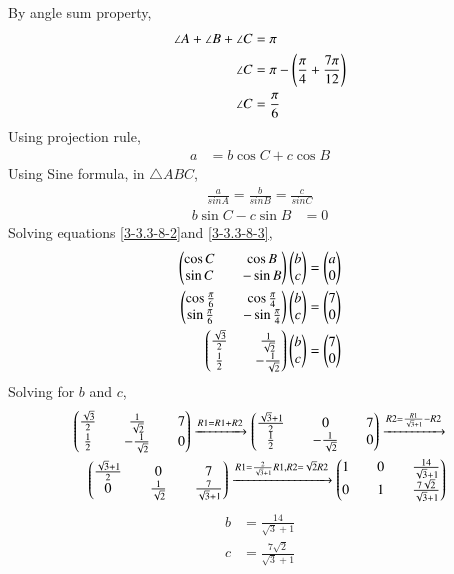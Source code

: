 \documentclass[journal]{IEEEtran}
\begin{document}
By angle sum property,
\begin{align}
    \angle{A}+\angle{B}+\angle{C}&=\pi\\
    \angle{C}&=\pi-\left(\frac{\pi}{4}+\frac{7\pi}{12}\right)\\
    \angle{C}&=\frac{\pi}{6}\label{3-3.3-8-1}
\end{align}
Using projection rule,
\begin{align}
    a&=b \cos C+c \cos B\label{3-3.3-8-2}
\end{align}
Using Sine formula, in $\triangle ABC$,
\begin{align}
    \frac{a}{sin A}=\frac{b}{sin B}=\frac{c}{sin C}
\end{align}
 \begin{align}
    b\sin C - c\sin B &=0\label{3-3.3-8-3}
\end{align}
 Solving equations \eqref{3-3.3-8-2}and \eqref{3-3.3-8-3},
\begin{align}
\begin{pmatrix}\cos C && \cos B\\ \sin C && -\sin B\end{pmatrix}\begin{pmatrix}b \\ c\end{pmatrix}=\begin{pmatrix}a \\ 0\end{pmatrix}\\
\begin{pmatrix}\cos \frac{\pi}{6} && \cos \frac{\pi}{4}\\ \sin \frac{\pi}{6} && -\sin\frac{\pi}{4}\end{pmatrix}\begin{pmatrix}b \\ c\end{pmatrix}=\begin{pmatrix}7 \\ 0\end{pmatrix}\\
\begin{pmatrix}\frac{\sqrt{3}}{2} && \frac{1}{\sqrt{2}}\\ \frac{1}{2} && -\frac{1}{\sqrt{2}}\end{pmatrix}\begin{pmatrix}b \\ c\end{pmatrix}=\begin{pmatrix}7 \\ 0\end{pmatrix}
\end{align}
Solving for $b$ and $c$,
\begin{align}
    \begin{pmatrix}\frac{\sqrt{3}}{2} && \frac{1}{\sqrt{2}} && 7 \\ \frac{1}{2} && -\frac{1}{\sqrt{2}} && 0\end{pmatrix}\xrightarrow{R1=R1+R2}\begin{pmatrix}\frac{\sqrt{3}+1}{2} && 0 && 7 \\ \frac{1}{2} && -\frac{1}{\sqrt{2}} && 0\end{pmatrix}\xrightarrow{R2=\frac{R1}{\sqrt{3}+1}-R2}\\\begin{pmatrix}\frac{\sqrt{3}+1}{2} && 0 && 7 \\ 0 && \frac{1}{\sqrt{2}} && \frac{7}{\sqrt{3}+1}\end{pmatrix}\xrightarrow{R1=\frac{2}{\sqrt{3}+1}R1, R2=\sqrt{2}R2}\begin{pmatrix}1 && 0 && \frac{14}{\sqrt{3}+1} \\ 0 && 1 && \frac{7\sqrt{2}}{\sqrt{3}+1}\end{pmatrix}
\end{align}
\begin{align}
    b&=\frac{14}{\sqrt{3}+1}\\
    c&=\frac{7\sqrt{2}}{\sqrt{3}+1}
\end{align}
\end{document}
